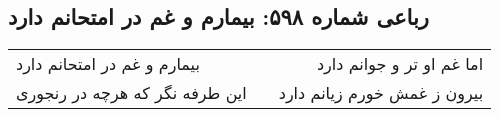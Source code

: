 \begin{center}
\section*{رباعی شماره ۵۹۸: بیمارم و غم در امتحانم دارد}
\label{sec:0598}
\begin{longtable}{l p{0.5cm} r}
بیمارم و غم در امتحانم دارد
&&
اما غم او تر و جوانم دارد
\\
این طرفه نگر که هرچه در رنجوری
&&
بیرون ز غمش خورم زیانم دارد
\\
\end{longtable}
\end{center}

